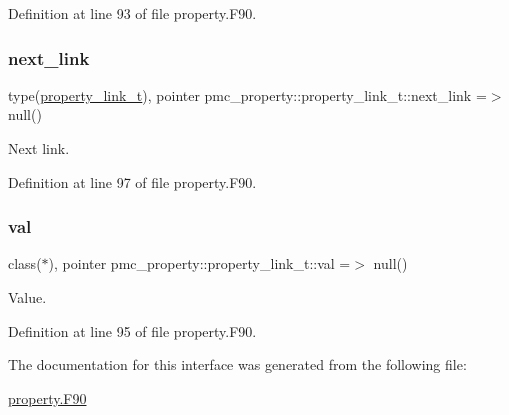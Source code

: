 Definition at line 93 of file property.\+F90.

\mbox{\label{structpmc__property_1_1property__link__t_a98c97c2d921ef44064c03ce3af5ab655}} 
\subsubsection{\texorpdfstring{next\+\_\+link}{next\_link}}
{\footnotesize\ttfamily type(\mbox{\hyperlink{structpmc__property_1_1property__link__t}{property\+\_\+link\+\_\+t}}), pointer pmc\+\_\+property\+::property\+\_\+link\+\_\+t\+::next\+\_\+link =$>$ null()\hspace{0.3cm}{\ttfamily [private]}}



Next link. 



Definition at line 97 of file property.\+F90.

\mbox{\label{structpmc__property_1_1property__link__t_aaed71cc4fa453bdd77972e6472c06d77}} 
\subsubsection{\texorpdfstring{val}{val}}
{\footnotesize\ttfamily class($\ast$), pointer pmc\+\_\+property\+::property\+\_\+link\+\_\+t\+::val =$>$ null()\hspace{0.3cm}{\ttfamily [private]}}



Value. 



Definition at line 95 of file property.\+F90.



The documentation for this interface was generated from the following file\+:\begin{DoxyCompactItemize}
\item 
\mbox{\hyperlink{property_8_f90}{property.\+F90}}\end{DoxyCompactItemize}
